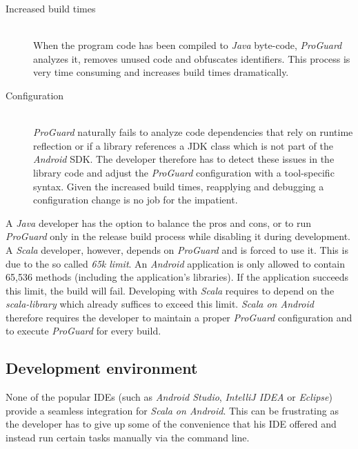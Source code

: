 \begin{description}

	\item[Increased build times]\hfill \\
	When the program code has been compiled to \textit{Java} byte-code, \textit{ProGuard} analyzes it, removes unused code and obfuscates identifiers. This process is very time consuming and increases build times dramatically.

	\item[Configuration]\hfill \\
	\textit{ProGuard} naturally fails to analyze code dependencies that rely on runtime reflection or if a library references a \ac{JDK} class which is not part of the \textit{Android} \ac{SDK}. The developer therefore has to detect these issues in the library code and adjust the \textit{ProGuard} configuration with a tool-specific syntax. Given the increased build times, reapplying and debugging a configuration change is no job for the impatient.

\end{description}

A \textit{Java} developer has the option to balance the pros and cons, or to run \textit{ProGuard} only in the release build process while disabling it during development. A \textit{Scala} developer, however, depends on \textit{ProGuard} and is forced to use it. This is due to the so called \textit{65k limit}. An \textit{Android} application is only allowed to contain 65,536 methods (including the application's libraries). If the application succeeds this limit, the build will fail. Developing with \textit{Scala} requires to depend on the \textit{scala-library} which already suffices to exceed this limit. \textit{Scala on Android} therefore requires the developer to maintain a proper \textit{ProGuard} configuration and to execute \textit{ProGuard} for every build.

\subsection{Development environment}

None of the popular \acp{IDE} (such as \textit{Android Studio}, \textit{IntelliJ IDEA} or \textit{Eclipse}) provide a seamless integration for \textit{Scala on Android}. This can be frustrating as the developer has to give up some of the convenience that his \ac{IDE} offered and instead run certain tasks manually via the command line.